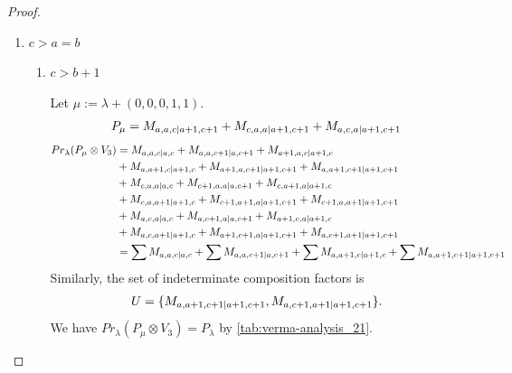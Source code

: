 \begin{proof}
\begin{enumerate}
  \item $c>a=b$
    \begin{enumerate}
      \item $c>b+1$ \par
        Let $\mu:=\lambda + (0,0,0,1,1) $.
        \begin{equation}\notag
          \begin{aligned}
            P_\mu = M_{a,a,c|a+1,c+1}
+ M_{c,a,a|a+1,c+1}
+ M_{a,c,a|a+1,c+1}
          \end{aligned}
        \end{equation}
        \begin{equation}\notag
          \begin{aligned}
            Pr_{\lambda}(P_\mu \otimes V_{3}) &=
M_{a,a,c|a,c}
+ M_{a,a,c+1|a,c+1}
+ M_{a+1,a,c|a+1,c}\\
                                            &
+ M_{a,a+1,c|a+1,c}
+ M_{a+1,a,c+1|a+1,c+1}
+ M_{a,a+1,c+1|a+1,c+1}\\
                                            &
+ M_{c,a,a|a,c}
+ M_{c+1,a,a|a,c+1}
+ M_{c,a+1,a|a+1,c}\\
                                            &
+ M_{c,a,a+1|a+1,c}
+ M_{c+1,a+1,a|a+1,c+1}
+ M_{c+1,a,a+1|a+1,c+1}\\
                                            &
+ M_{a,c,a|a,c}
+ M_{a,c+1,a|a,c+1}
+ M_{a+1,c,a|a+1,c}\\
                                            &
+ M_{a,c,a+1|a+1,c}
+ M_{a+1,c+1,a|a+1,c+1}
+ M_{a,c+1,a+1|a+1,c+1} \\
                                               &=
\sum M_{a,a,c|a,c}
+ \sum M_{a,a,c+1|a,c+1}
+ \sum M_{a,a+1,c|a+1,c}
+ \sum M_{a,a+1,c+1|a+1,c+1}
          \end{aligned}
        \end{equation}
      Similarly, the set of indeterminate composition factors is 
\begin{equation}\notag
  \begin{aligned}
    U = \{
M_{a,a+1,c+1|a+1,c+1},
M_{a,c+1,a+1|a+1,c+1}
\}.
  \end{aligned}
\end{equation}
       We have $Pr_{\lambda}(P_\mu \otimes V_{3}) = P_\lambda  $ by \cref{tab:verma-analysis_21}.
\begin{table}[htbp]
\centering
\caption{Calculation of Verma modules in $\operatorname{Filt}(P_*) \setminus \operatorname{Filt}(\prl(P_\lambda \otimes V_{3})) $ } \label{tab:verma-analysis_21}

\end{table}
\end{enumerate}
\end{enumerate}
\end{proof}
